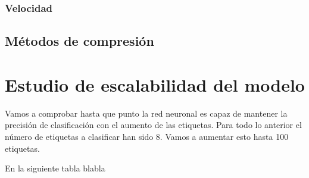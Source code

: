 \subsubsection{Velocidad}

\subsubsection{}

\subsection{Métodos de compresión}

\subsubsection{}

\subsubsection{}


\section{Estudio de escalabilidad del modelo}

Vamos a comprobar hasta que punto la red neuronal es capaz de mantener la precisión de clasificación con el aumento de las etiquetas. Para todo lo anterior el número de etiquetas a clasificar han sido 8. Vamos a aumentar esto hasta 100 etiquetas.

En la siguiente tabla blabla